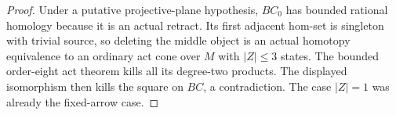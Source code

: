 \begin{proof}
Under a putative projective-plane hypothesis, $BC_0$
has bounded rational homology because it is an actual
retract.  Its first adjacent hom-set is singleton
with trivial source, so deleting the middle object
is an actual homotopy equivalence to an ordinary
act cone over $M$ with $|Z|\leq3$ states.  The
bounded order-eight act theorem kills all its
degree-two products.  The displayed isomorphism
then kills the square on $BC$, a contradiction.
The case $|Z|=1$ was already the fixed-arrow case.
\end{proof}
